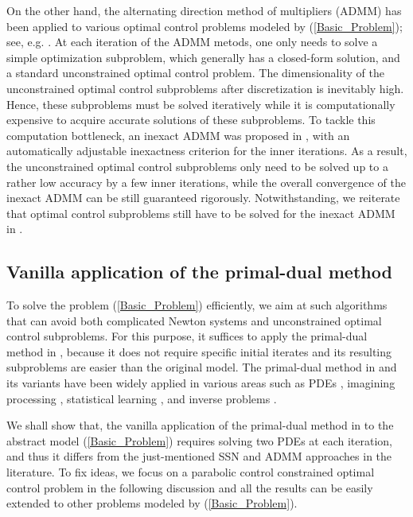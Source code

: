 \documentclass[final]{siamart171218}
\theoremstyle{remark}
\begin{document}
On the other hand, the alternating direction method of multipliers (ADMM) \cite{gabay1975dual,glowinski1975approximation} has  been applied to various optimal control problems modeled by (\ref{Basic_Problem}); see, e.g.  \cite{attouch2008augmented,GSY2019,glowinski2022,pougkakiotis2020,zhang2017}.  At each iteration of the ADMM metods, one only needs to solve a simple optimization subproblem, which generally has a closed-form solution, and a standard unconstrained optimal control problem. The dimensionality of the unconstrained optimal control subproblems after discretization is inevitably high. Hence, these subproblems must be solved iteratively while it is computationally expensive to acquire accurate solutions of these subproblems. To tackle this computation bottleneck, an inexact ADMM was proposed in \cite{glowinski2022}, with an automatically adjustable inexactness criterion for the inner iterations. As a result, the unconstrained optimal control subproblems only need to be solved up to a rather low accuracy by a few inner iterations, while the overall convergence of the inexact ADMM can be still guaranteed rigorously. Notwithstanding, we reiterate that optimal control subproblems still have to be solved for the inexact ADMM in \cite{glowinski2022}.


\subsection{Vanilla application of the primal-dual method}
To solve the problem (\ref{Basic_Problem}) efficiently, we aim at such algorithms that can avoid both complicated Newton systems and unconstrained optimal control subproblems. For this purpose, it suffices to apply the primal-dual method in \cite{chambolle2011first}, because it does not require specific initial iterates and its resulting subproblems are easier than the original model. The primal-dual method in \cite{chambolle2011first} and its variants have been widely applied in various areas such as PDEs \cite{liu2023jcp,liu2023arxiv}, imagining processing \cite{chambolle2011first}, statistical learning \cite{goldstein2015adaptive}, and inverse problems \cite{biccari2022,clason2017primal,tian2018convergence,valkonen2014primal}.

We shall show that, the vanilla application of the primal-dual method in \cite{chambolle2011first} to the abstract model (\ref{Basic_Problem}) requires solving two PDEs at each iteration, and thus it differs from the just-mentioned SSN and ADMM approaches in the literature. To fix ideas, we focus on a parabolic control constrained optimal control problem in the following discussion and all the results can be easily extended to other  problems modeled by (\ref{Basic_Problem}).
\end{document}
